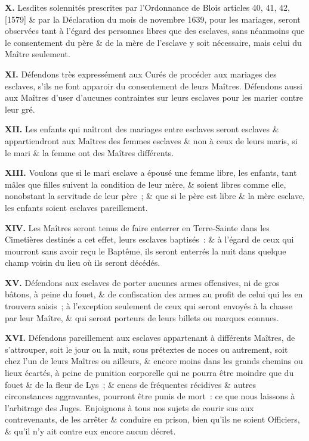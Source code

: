 \documentclass[twoside]{book} %
\newcommand{\labelchar}[1]{\textbf{\color{rubric} #1}}
\begin{document}
\labelchar{X.} Lesdites solennités prescrites par l’Ordonnance de Blois articles 40, 41, 42, [1579] \& par la Déclaration du mois de novembre 1639, pour les mariages, seront observées tant à l’égard des personnes libres que des esclaves, sans néanmoins que le consentement du père \& de la mère de l’esclave y soit nécessaire, mais celui du Maître seulement.\par
\labelchar{XI.} Défendons très expressément aux Curés de procéder aux mariages des esclaves, s’ils ne font apparoir du consentement de leurs Maîtres. Défendons aussi aux Maîtres d’user d’aucunes contraintes sur leurs esclaves pour les marier contre leur gré.\par
\labelchar{XII.} Les enfants qui naîtront des mariages entre esclaves seront esclaves \& appartiendront aux Maîtres des femmes esclaves \& non à ceux de leurs maris, si le mari \& la femme ont des Maîtres différents.\par
\labelchar{XIII.} Voulons que si le mari esclave a épousé une femme libre, les enfants, tant mâles que filles suivent la condition de leur mère, \& soient libres comme elle, nonobstant la servitude de leur père ; \& que si le père est libre \& la mère esclave, les enfants soient esclaves pareillement.\par
\labelchar{XIV.} Les Maîtres seront tenus de faire enterrer en Terre-Sainte dans les Cimetières destinés a cet effet, leurs esclaves baptisés : \& à l’égard de ceux qui mourront sans avoir reçu le Baptême, ils seront enterrés la nuit dans quelque champ voisin du lieu où ils seront décédés.\par
\labelchar{XV.} Défendons aux esclaves de porter aucunes armes offensives, ni de gros bâtons, à peine du fouet, \& de confiscation des armes au profit de celui qui les en trouvera saisis ; à l’exception seulement de ceux qui seront envoyés à la chasse par leur Maître, \& qui seront porteurs de leurs billets ou marques connues.\par
\labelchar{XVI.} Défendons pareillement aux esclaves appartenant à différents Maîtres, de s’attrouper, soit le jour ou la nuit, sous prétextes de noces ou autrement, soit chez l’un de leurs Maîtres ou ailleurs, \& encore moins dans les grands chemins ou lieux écartés, à peine de punition corporelle qui ne pourra être moindre que du fouet \& de la fleur de Lys ; \& encas de fréquentes récidives \& autres circonstances aggravantes, pourront être punis de mort : ce que nous laissons à l’arbitrage des Juges. Enjoignons à tous nos sujets de courir sus aux contrevenants, de les arrêter \& conduire en prison, bien qu’ils ne soient Officiers, \& qu’il n’y ait contre eux encore aucun décret.\par
\end{document}
